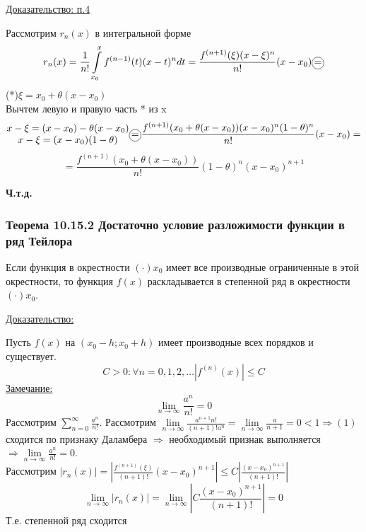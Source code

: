 \documentclass[12pt]{article}
\newcommand*\circled[1]{\tikz[baseline=(char.base)]{
    \node[shape=circle, draw, inner sep=1pt, 
        minimum height=12pt] (char) {#1};}}
\let\oldint\int
\let\oldsum\sum
\let\oldlim\lim
\renewcommand{\int}{\oldint\limits}
\renewcommand{\sum}{\oldsum\limits}
\renewcommand{\lim}{\oldlim\limits}
\begin{document}
    \underline{Доказательство: п.4}
    \begin{adjustwidth}{1.5em}{1.5em}
      Рассмотрим $r_n(x)$ в интегральной форме
      \[r_n(x)=\frac{1}{n!}\int_{x_0}^{x}f^{(n-1)}(t)(x-t)^n dt = \frac{f^{(n+1)}(\xi)(x-\xi)^n}{n!}(x-x_0) \circled{=}\]
      (*)$\xi=x_0+\theta(x-x_0)$\\
      Вычтем левую и правую часть * из x
      \[\begin{matrix}
        x-\xi=(x-x_0)-\theta(x-x_0)\\
        x-\xi=(x-x_0)(1-\theta)
      \end{matrix}
      \circled{=}\dfrac{f^{(n+1)}(x_0+\theta(x-x_0))(x-x_0)^n (1-\theta)^n}{n!}(x-x_0)=\]
      \[= \dfrac{f^{(n+1)}(x_0+\theta(x-x_0))}{n!}(1-\theta)^n(x-x_0)^{n+1}\]
    \end{adjustwidth}
    \begin{center}
      \textbf{Ч.т.д.}
    \end{center}

    \subsubsection*{Теорема 10.15.2 Достаточно условие разложимости функции в ряд Тейлора}\label{th:10.15.2}
    \par\noindent
    Если функция в окрестности $(\cdot) x_0$ имеет все производные ограниченные в этой окрестности, то функция
    $f(x)$ раскладывается в степенной ряд в окрестности $(\cdot) x_0$.

    \underline{Доказательство:}
    \begin{adjustwidth}{1.5em}{1.5em}
      Пусть $f(x)$ на $(x_0-h;x_0+h)$ имеет производные всех порядков и существует.
      \[C>0:\forall n =0,1,2,\dots |f^{(n)}(x)|\leq C\]
      \underline{Замечание:} 
      \[\lim_{n \to \infty} \frac{a^n}{n!}=0\]
      Рассмотрим $\sum_{n=0}^{\infty}\frac{a^n}{n!}$. Рассмотрим $\lim_{n \to \infty} \frac{a^{n+1}n!}{(n+1)!a^n}=
      \lim_{n\to\infty} \frac{a}{n+1}=0<1 \Rightarrow (1)$ сходится по признаку Даламбера $\Rightarrow$
      необходимый признак выполняется $\Rightarrow \lim_{n \to \infty }\frac{a^n}{n!}=0$.\\
      Рассмотрим $|r_n(x)|=|\frac{f^{(n+1)}(\xi)}{(n+1)!}(x-x_0)^{n+1}|\leq C |\frac{(x-x_0)^{n+1}}{(n+1)!}|$
      \[\lim_{n \to \infty} |r_n(x)|=\lim_{n \to \infty} |C \frac{(x-x_0)^{n+1}}{(n+1)!}|= 0\]
      Т.е. степенной ряд сходится
    \end{adjustwidth}
\end{document}
